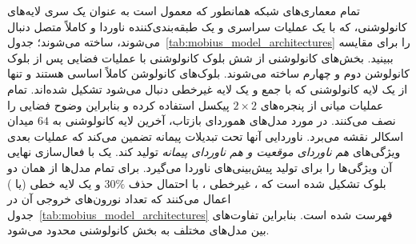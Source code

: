 تمام معماری‌های شبکه همانطور که معمول است به عنوان یک سری لایه‌های کانولوشنی، که با یک عملیات  سراسری و یک طبقه‌بندی‌کننده ناوردا و کاملاً متصل دنبال می‌شوند، ساخته می‌شوند؛ جدول~\ref{tab:mobius_model_architectures} را برای مقایسه ببینید.
بخش‌های کانولوشنی از شش بلوک کانولوشنی با عملیات  فضایی پس از بلوک کانولوشن دوم و چهارم ساخته می‌شوند.
بلوک‌های کانولوشن کاملاً اساسی هستند و تنها از یک لایه کانولوشنی که با جمع  و یک لایه غیرخطی دنبال می‌شود تشکیل شده‌اند.
تمام عملیات  میانی از پنجره‌های  $2\times2$ پیکسل استفاده کرده و بنابراین وضوح فضایی را نصف می‌کنند.
در مورد مدل‌های هموردای بازتاب، آخرین لایه کانولوشنی به $64$ میدان اسکالر نقشه می‌برد.
ناوردایی آنها تحت تبدیلات پیمانه تضمین می‌کند که عملیات  بعدی ویژگی‌های \emph{هم ناوردای موقعیت و هم ناوردای پیمانه} تولید کند.
یک  با فعال‌سازی  نهایی آن ویژگی‌ها را برای تولید پیش‌بینی‌های ناوردا می‌گیرد.
برای تمام مدل‌ها از همان دو بلوک  تشکیل شده است که ، غیرخطی ،  با احتمال حذف $30\%$ و یک لایه خطی (یا ) اعمال می‌کنند که تعداد نورون‌های خروجی آن در جدول~\ref{tab:mobius_model_architectures} فهرست شده است.
بنابراین تفاوت‌های بین مدل‌های مختلف به بخش کانولوشنی محدود می‌شود.


